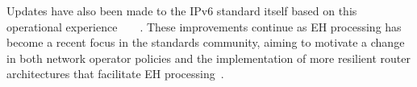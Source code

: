 \documentclass[conference]{IEEEtran}
\begin{document}
Updates have also been made to the IPv6 standard itself based on this
operational experience~\cite{RFC5722}~\cite{RFC6734}~\cite{RFC6564}~\cite{RFC8200}. These improvements continue as EH processing has become a recent focus in the standards community, aiming to motivate a change in both network operator policies and the implementation of more resilient router architectures that facilitate EH processing~\cite{ietf-6man-hbh-processing-06, ietf-v6ops-hbh-03, ietf-6man-eh-limits-02}. 



\small

\end{document}
